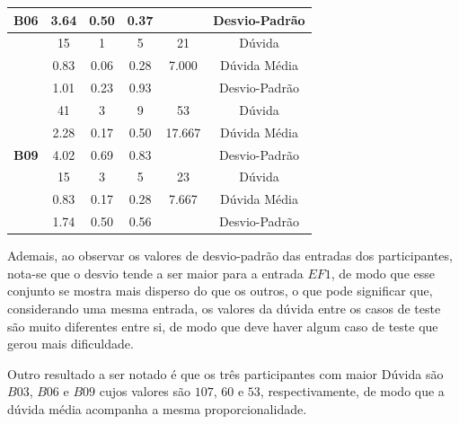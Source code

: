 \begin{table}[htbp]
\begin{tabular}{|c|c|c|c|c|c|}
		\multirow{-3}{*}{\cellcolor[HTML]{F2F2F2}\textbf{B06}} & 3.64 & 0.50 & 0.37 &  & Desvio-Padrão \\ \hline
		\rowcolor[HTML]{D9D9D9} 
		\cellcolor[HTML]{F2F2F2} & 15 & 1 & 5 & 21 & Dúvida \\ \cline{2-6} 
		\cellcolor[HTML]{F2F2F2} & 0.83 & 0.06 & 0.28 & 7.000 & Dúvida Média \\ \cline{2-6} 
		\rowcolor[HTML]{D9D9D9} 
		\multirow{-3}{*}{\cellcolor[HTML]{F2F2F2}\textbf{B08}} & 1.01 & 0.23 & 0.93 &  & Desvio-Padrão \\ \hline
		\cellcolor[HTML]{F2F2F2} & 41 & 3 & 9 & 53 & Dúvida \\ \cline{2-6} 
		\rowcolor[HTML]{D9D9D9} 
		\cellcolor[HTML]{F2F2F2} & 2.28 & 0.17 & 0.50 & 17.667 & Dúvida Média \\ \cline{2-6} 
		\multirow{-3}{*}{\cellcolor[HTML]{F2F2F2}\textbf{B09}} & 4.02 & 0.69 & 0.83 &  & Desvio-Padrão \\ \hline
		\rowcolor[HTML]{D9D9D9} 
		\cellcolor[HTML]{F2F2F2} & 15 & 3 & 5 & 23 & Dúvida \\ \cline{2-6} 
		\cellcolor[HTML]{F2F2F2} & 0.83 & 0.17 & 0.28 & 7.667 & Dúvida Média \\ \cline{2-6} 
		\rowcolor[HTML]{D9D9D9} 
		\multirow{-3}{*}{\cellcolor[HTML]{F2F2F2}\textbf{B10}} & 1.74 & 0.50 & 0.56 &  & Desvio-Padrão \\ \hline
	\end{tabular}
	\label{tab:F3_A2_D_ENTRADAS}
\end{table}

Ademais, ao observar os valores de desvio-padrão das entradas dos participantes, nota-se que o desvio tende a ser maior para a entrada $EF1$, de modo que esse conjunto se mostra mais disperso do que os outros, o que pode significar que, considerando uma mesma entrada, os valores da dúvida entre os casos de teste são muito diferentes entre si, de modo que deve haver algum caso de teste que gerou mais dificuldade.

Outro resultado a ser notado é que os três participantes com maior Dúvida são $B03$, $B06$ e $B09$ cujos valores são $107$, $60$ e $53$, respectivamente, de modo que a dúvida média acompanha a mesma proporcionalidade.

